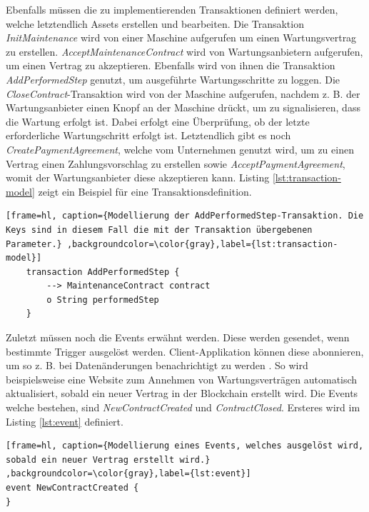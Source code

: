 Ebenfalls müssen die zu implementierenden Transaktionen definiert werden, welche letztendlich Assets erstellen und bearbeiten. Die Transaktion \textit{InitMaintenance} wird von einer Maschine aufgerufen um einen Wartungsvertrag zu erstellen. \textit{AcceptMaintenanceContract} wird von Wartungsanbietern aufgerufen, um einen Vertrag zu akzeptieren. Ebenfalls wird von ihnen die Transaktion \textit{AddPerformedStep} genutzt, um ausgeführte Wartungsschritte zu loggen. Die \textit{CloseContract}-Transaktion wird von der Maschine aufgerufen, nachdem z. B. der Wartungsanbieter einen Knopf an der Maschine drückt, um zu signalisieren, dass die Wartung erfolgt ist. Dabei erfolgt eine Überprüfung, ob der letzte erforderliche Wartungschritt erfolgt ist. Letztendlich gibt es noch \textit{CreatePaymentAgreement}, welche vom Unternehmen genutzt wird, um zu einen Vertrag einen Zahlungsvorschlag zu erstellen sowie \textit{AcceptPaymentAgreement}, womit der Wartungsanbieter diese akzeptieren kann. Listing \ref{lst:transaction-model} zeigt ein Beispiel für eine Transaktionsdefinition.

\begin{lstfloat}
    \begin{lstlisting}[frame=hl, caption={Modellierung der AddPerformedStep-Transaktion. Die Keys sind in diesem Fall die mit der Transaktion übergebenen Parameter.} ,backgroundcolor=\color{gray},label={lst:transaction-model}]
    transaction AddPerformedStep {
        --> MaintenanceContract contract
        o String performedStep
    }
    \end{lstlisting} 
\end{lstfloat}

Zuletzt müssen noch die Events erwähnt werden. Diese werden gesendet, wenn bestimmte Trigger ausgelöst werden. Client-Applikation können diese abonnieren, um so z. B. bei Datenänderungen benachrichtigt zu werden \cite{HyperledgerComposerTeamEmittingEventsHyperledger}. So wird beispielsweise eine Website zum Annehmen von Wartungsverträgen automatisch aktualisiert, sobald ein neuer Vertrag in der Blockchain erstellt wird. Die Events welche bestehen, sind \textit{NewContractCreated} und \textit{ContractClosed}. Ersteres wird im Listing \ref{lst:event} definiert. 

\begin{lstfloat}
\begin{lstlisting}[frame=hl, caption={Modellierung eines Events, welches ausgelöst wird, sobald ein neuer Vertrag erstellt wird.} ,backgroundcolor=\color{gray},label={lst:event}]
event NewContractCreated {
}
\end{lstlisting} 
\end{lstfloat}

